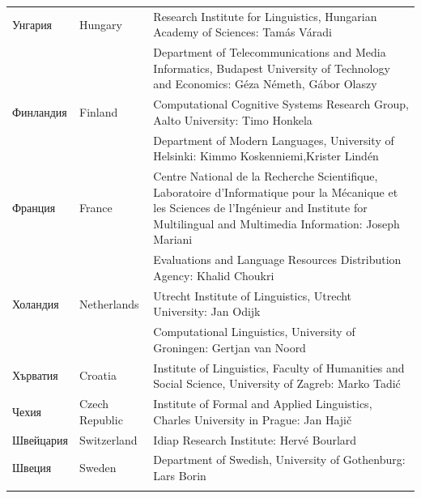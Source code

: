 \documentclass[]{../../metanetpaper}
\begin{document}
\begin{longtable}{@{}llp{110mm}@{}}
  Унгария & \textcolor{grey1}{Hungary} & Research Institute for Linguistics, Hungarian Academy of Sciences: Tamás Váradi\\  \addlinespace
  & & Department of Telecommunications and Media Informatics, Budapest University of Technology and Economics: Géza Németh, Gábor Olaszy\\ \addlinespace
  Финландия & \textcolor{grey1}{Finland} & Computational Cognitive
  Systems Research Group, Aalto University: \newline Timo Honkela\\ \addlinespace
  & & Department of Modern Languages, University of Helsinki: Kimmo
  Koskenniemi,\newline Krister Lindén \\ \addlinespace
  Франция & \textcolor{grey1}{France} & Centre National de la Recherche Scientifique, Laboratoire d'Informatique pour la Mécanique et les Sciences de l'Ingénieur and Institute for Multilingual and Multimedia Information: Joseph Mariani \\ \addlinespace
  & & Evaluations and Language Resources Distribution Agency: Khalid Choukri\\ \addlinespace 
  Холандия & \textcolor{grey1}{Netherlands} & Utrecht Institute of Linguistics, Utrecht University: Jan Odijk\\ \addlinespace 
  & & Computational Linguistics, University of Groningen: Gertjan van
  Noord\\ \addlinespace
  Хърватия & \textcolor{grey1}{Croatia} & Institute of Linguistics,
  Faculty of Humanities and Social Science, University of Zagreb:
  Marko Tadić \\ \addlinespace
  Чехия & \textcolor{grey1}{Czech Republic} & Institute of Formal and Applied Linguistics, Charles University in Prague: Jan Hajič \\ \addlinespace
  Швейцария & \textcolor{grey1}{Switzerland} & Idiap Research
  Institute: Hervé Bourlard \\ \addlinespace 
  Швеция & \textcolor{grey1}{Sweden} & Department of Swedish, University of Gothenburg: Lars Borin \\ \addlinespace 
\end{longtable}
\normalsize

\renewcommand*{\figureformat}{}
\renewcommand*{\captionformat}{}
\end{document}
